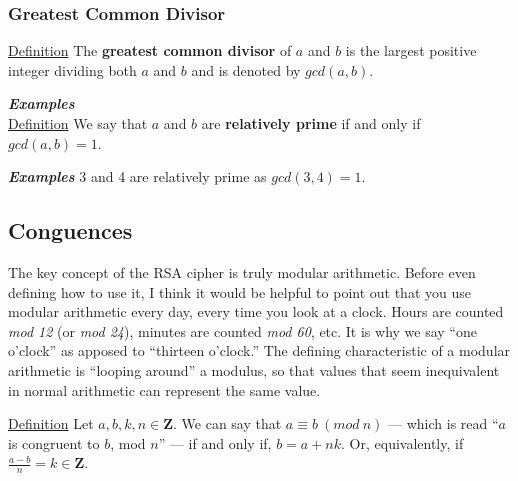 \documentclass{article}
\begin{document}
        \subsubsection{Greatest Common Divisor}
        \underline{Definition} The \textbf{greatest common divisor} of $a$ and $b$ is the largest positive integer dividing both $a$ and $b$ and is denoted by $gcd(a,b)$.
        
        \textbf{\textit{Examples}}\\
        \underline{Definition} We say that $a$ and $b$ are \textbf{relatively prime} if and only if $gcd(a,b)=1$.
        
        \textbf{\textit{Examples}} 3 and 4 are relatively prime as $gcd(3,4)=1$.
        
        \subsection{Conguences}
        The key concept of the RSA cipher is truly modular arithmetic.  
        Before even defining how to use it, I think it would be helpful to point out that you use modular arithmetic every day, every time you look at a clock.
        Hours are counted \textit{mod 12} (or \textit{mod 24}), minutes are counted \textit{mod 60}, etc.  
        It is why we say ``one o'clock'' as apposed to ``thirteen o'clock.''
        The defining characteristic of a modular arithmetic is ``looping around'' a modulus, so that values that seem inequivalent in normal arithmetic can represent the same value.
        
        
        \underline{Definition} Let $a,b,k,n\in\mathbf{Z}$.  
        We can say that $a\equiv b\ (mod\ n)$ --- which is read ``$a$ is congruent to $b$, mod $n$'' --- if and only if, $b=a+nk$.  
        Or, equivalently, if $\displaystyle\frac{a-b}{n}=k\in\mathbf{Z}$.
        
        
        
\end{document}
